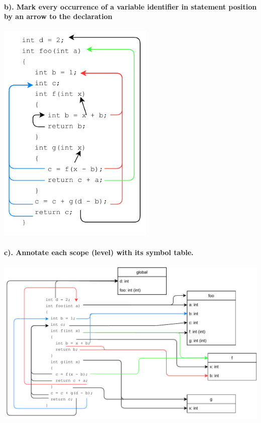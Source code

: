 \documentclass[hidelinks]{uva-inf-article}
\begin{document}
\begin{flushleft}
\paragraph{b). Mark every occurrence of a variable identifier in statement position by an arrow to the declaration\\}
\includegraphics[width=7.5cm]{images/1b.pdf}
\paragraph{c). Annotate each scope (level) with its symbol table.\\}
\includegraphics[width=14cm]{images/1c.pdf}
\newpage

\end{flushleft}
\end{document}
